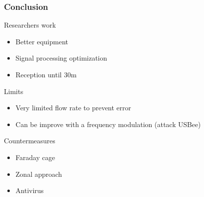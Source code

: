 \begin{frame}
\frametitle{Conclusion}
\begin{block}{Researchers work}
\begin{itemize}
\item Better equipment
\item Signal processing optimization
\item Reception until 30m
\end{itemize}
\end{block}
\begin{block}{Limits}
\begin{itemize}
\item Very limited flow rate to prevent error
\item Can be improve with a frequency modulation (attack USBee)
\end{itemize}
\end{block}
\begin{block}{Countermeasures}
\begin{itemize}
\item Faraday cage
\item Zonal approach
\item Antivirus
\end{itemize}
\end{block}
\end{frame}